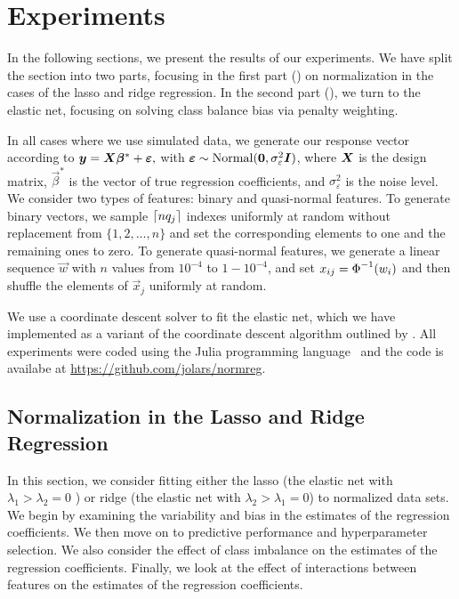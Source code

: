 \section{Experiments}\label{sec:experiments}

In the following sections, we present the results of our experiments. We have split the
section into two parts, focusing in the first part () on
normalization in the cases of the lasso and ridge regression. In the second part
(), we turn to the elastic net, focusing on solving class
balance bias via penalty weighting.

In all cases where we use simulated data, we generate our response vector according to
\(\boldsymbol{y} = \boldsymbol{X}\boldsymbol{\beta}^* + \boldsymbol{\varepsilon},\) with \(\boldsymbol{\varepsilon} \sim
\operatorname{Normal}(\boldsymbol{0}, \sigma_\varepsilon^2 \boldsymbol{I})\), where \(\boldsymbol{X}\) is the design matrix,
\(\vec{\beta}^*\) is the vector of true regression coefficients, and
\(\sigma_\varepsilon^2\) is the noise level. We consider two types of features: binary and
quasi-normal features. To generate binary vectors, we sample \(\lceil nq_j \rceil\) indexes
uniformly at random without replacement from \(\{1,2,\dots,n\}\) and set the corresponding
elements to one and the remaining ones to zero. To generate quasi-normal features, we
generate a linear sequence \(\vec{w}\) with \(n\) values from \(10^{-4}\) to \(1 -
10^{-4}\), and set \(x_{ij} = \operatorname{\Phi}^{-1}(w_i)\) and then shuffle the elements of
\(\vec{x}_j\) uniformly at random.

We use a coordinate descent solver to fit the elastic net, which we have implemented as a
variant of the coordinate descent algorithm outlined by \citet{friedman2010}. All
experiments were coded using the Julia programming language~\citep{bezanson2017} and the
code is availabe at \url{https://github.com/jolars/normreg}.

\subsection{Normalization in the Lasso and Ridge Regression}\label{sec:experiments-lassoridge}

In this section, we consider fitting either the lasso (the elastic net with \(\lambda_1 >
\lambda_2 = 0\) ) or ridge (the elastic net with \(\lambda_2 > \lambda_1 = 0\)) to
normalized data sets. We begin by examining the variability and bias in the estimates of
the regression coefficients. We then move on to predictive performance and hyperparameter
selection. We also consider the effect of class imbalance on the estimates of the
regression coefficients. Finally, we look at the effect of interactions between features on
the estimates of the regression coefficients.

